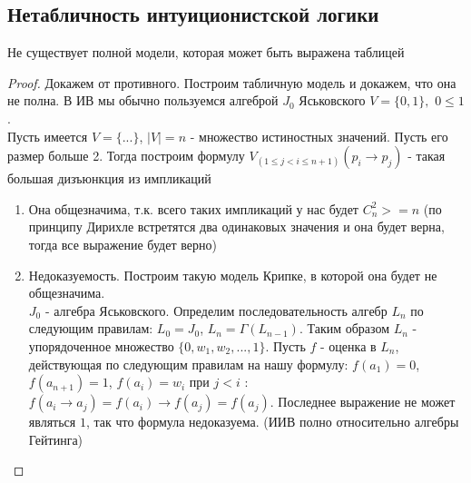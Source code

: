 \subsection{Нетабличность интуиционистской логики}
\label{sec-6-5}
\begin{theorem}
Не существует полной модели, которая может быть выражена таблицей
\end{theorem}
\begin{proof}
Докажем от противного. Построим табличную модель и докажем, что она не полна. В ИВ мы обычно пользуемся алгеброй $J_{0}$ Яськовского $V = \lbrace 0, 1 \rbrace,$ $0 \leq 1$.\\
Пусть имеется $V = \lbrace ... \rbrace$, $\vert V \vert = n$ - множество истиностных значений. Пусть его размер больше 2.
Тогда построим формулу $V_{(1 \leq j < i \leq n + 1)}(p_{i} \rightarrow p_{j})$ - такая большая дизъюнкция из импликаций
\begin{enumerate}
\item Она общезначима, т.к. всего таких импликаций у нас будет $C_{n}^{2} >= n$ (по принципу Дирихле встретятся два одинаковых значения и она будет верна, тогда все выражение будет верно)
\item Недоказуемость. Построим такую модель Крипке, в которой она будет не общезначима.\\
$J_{0}$ - алгебра Яськовского. Определим последовательность алгебр $L_{n}$ по следующим правилам: $L_{0} = J_{0}$, $L_{n} = \Gamma(L_{n - 1})$. Таким образом $L_{n}$ - упорядоченное множество $\lbrace 0, w_{1}, w_{2}, ..., 1 \rbrace$. Пусть $f$ - оценка в $L_{n}$, действующая по следующим правилам на нашу формулу: $f(a_{1}) = 0$, $f(a_{n+1}) = 1$, $f(a_{i}) = w_{i}$ при $j < i$ $:$ $f(a_{i} \rightarrow a_{j}) = f(a_{i}) \rightarrow f(a_{j}) = f(a_{j})$. Последнее выражение не может являться $1$, так что формула недоказуема. (ИИВ полно относительно алгебры Гейтинга)
\end{enumerate}
\end{proof}
